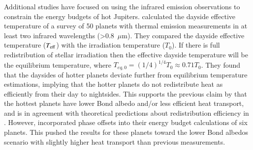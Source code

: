 Additional studies have focused on using the infrared \spitzer emission observations to constrain the energy budgets of hot Jupiters. \citet{Schwartz2015} calculated the dayside effective temperature of a survey of 50 planets with thermal emission measurements in at least two infrared wavelengths (>0.8~$\mu$m). They compared the dayside effective temperature ($T_{\rm eff}$) with the irradiation temperature ($T_0$). If there is full redistribution of stellar irradiation then the effective dayside temperature will be the equilibrium temperature, where $T_{eq,\textit{0}} = (1/4)^{1/4} T_0 \approx 0.71T_0$. They found that the daysides of hotter planets deviate further from equilibrium temperature estimations, implying that the hotter planets do not redistribute heat as efficiently from their day to nightsides. This supports the previous claim by \citet{Cowan2011b} that the hottest planets have lower Bond albedo and/or less efficient heat transport, and is in agreement with theoretical predictions about redistribution efficiency in \citet{Perez-Becker2013}. However, \citet{Schwartz2017} incorporated phase offsets into their energy budget calculations of six planets. This pushed the results for these planets toward the lower Bond albedos scenario with slightly higher heat transport than previous measurements.

